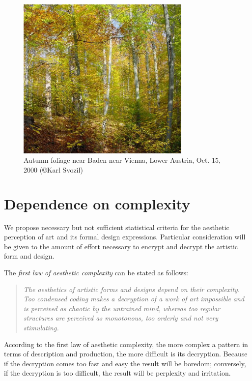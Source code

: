 \documentclass[%
 reprint,
 showpacs,
 showkeys,
 amsmath,
 amssymb,
 aps,
 pra,
 longbibliography,
 floatfix,
 ]{revtex4-1}
\begin{document}
\begin{figure}
\centerline{\includegraphics[width=8.5cm]{2008-ae-foliage}}
  \caption{Autumn foliage near Baden near Vienna, Lower Austria, Oct. 15, 2000
(\copyright Karl Svozil)}
   \label{2005-ae-foliage}
 \end{figure}

\section{Dependence on complexity}



We propose necessary but not sufficient statistical criteria for the aesthetic perception of art and its formal design expressions.
Particular consideration will be given to the amount of effort necessary to encrypt and decrypt the artistic form and design.

The  \textit{first law of aesthetic complexity} can be stated as follows:
\begin{quote}
{\em
The aesthetics of artistic forms and designs depend on their complexity.
Too condensed coding makes a decryption of a work of art impossible and is perceived as chaotic by the untrained mind, whereas too regular structures are perceived as monotonous, too orderly and not very stimulating.
}
\end{quote}

According to the first law of aesthetic complexity, the more complex a pattern in terms of description and production, the more difficult is its decryption.
Because if the decryption comes too fast and easy the result will be boredom;
conversely, if the decryption is too difficult, the result will be perplexity and irritation.
\end{document}
